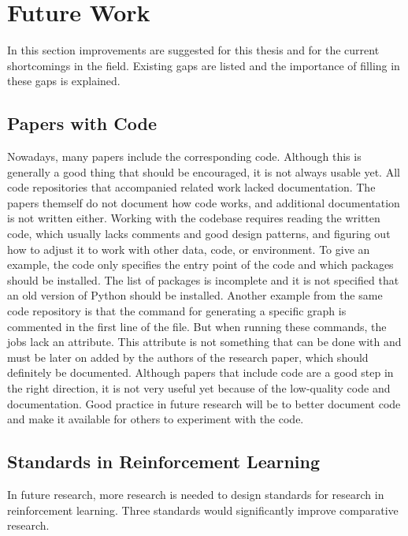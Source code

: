 \chapter{Future Work}\label{sec:future-work}

In this section improvements are suggested for this thesis and for the current
shortcomings in the field. Existing gaps are listed and the importance of
filling in these gaps is explained.


\section{Papers with Code}

Nowadays, many papers include the corresponding
code. Although this is generally a good thing
that should be encouraged, it is not always usable yet. All code repositories
that accompanied related work lacked documentation. The papers themself do not
document how code works, and additional documentation is not written either.
Working with the codebase requires reading the written code, which usually
lacks comments and good design patterns, and figuring out how to adjust it to
work with other data, code, or environment. To give an example, the \mrlco
code only specifies the entry
point of the code and which packages should be installed. The list of packages
is incomplete and it is not specified that an old version of Python should be
installed. Another example from the same code repository is that the command
for generating a specific graph is commented in the first line of the file.
But when running these commands, the jobs lack an 
attribute. This attribute is not something that can be done with 
and must be later on added by the authors of the research paper, which should
definitely be documented. Although papers that include code are a good step in
the right direction, it is not very useful yet because of the low-quality code
and documentation. Good practice in future research will be to better document
code and make it available for others to experiment with the code.


\section{Standards in Reinforcement Learning}\label{sec:standards}

In future research, more research is needed to design standards for research
in reinforcement learning. Three standards would significantly improve comparative
research.

